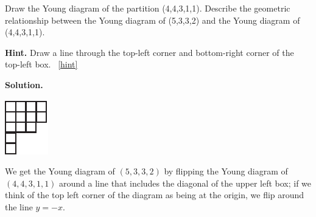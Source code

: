 \documentclass{book}
\begin{document}
\setcounter{project}{303}
\addtocounter{project}{-1}
\begin{activity}[]\label{activity-296}
\hypertarget{p-1515}{}%
Draw the Young diagram of the partition (4,4,3,1,1). Describe the geometric relationship between the Young diagram of (5,3,3,2) and the Young diagram of (4,4,3,1,1).%
\par\smallskip%
\noindent\textbf{Hint.}\hypertarget{hint-189}{}\quad%
\hypertarget{p-1516}{}%
Draw a line through the top-left corner and bottom-right corner of the top-left box.%
~\hfill{\tiny\hyperlink{a-303}{[hint]}\hypertarget{q-303}{}}\par\smallskip%
\noindent\textbf{Solution.}\hypertarget{solution-191}{}\quad%
\begin{sidebyside}{1}{0.42}{0.42}{0}
\begin{sbspanel}{0.16}
\includegraphics[width=1\linewidth]{images/Young44311}
\end{sbspanel}
\end{sidebyside}
\par
\hypertarget{p-1517}{}%
We get the Young diagram of \((5,3,3,2)\) by flipping the Young diagram of \((4,4,3,1,1)\) around a line that includes the diagonal of the upper left box; if we think of the top left corner of the diagram as being at the origin, we flip around the line \(y=-x\).%
\end{activity}

\clearpage
\end{document}
